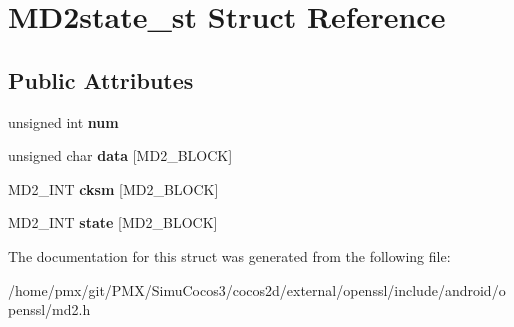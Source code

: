 \hypertarget{structMD2state__st}{}\section{M\+D2state\+\_\+st Struct Reference}
\label{structMD2state__st}
\subsection*{Public Attributes}
\begin{DoxyCompactItemize}
\item 
\mbox{\label{structMD2state__st_a065276e735f2af3cd657e71c79cb5e09}} 
unsigned int {\bfseries num}
\item 
\mbox{\label{structMD2state__st_a57082d32f125c264b715c2e669bd9a85}} 
unsigned char {\bfseries data} \mbox{[}M\+D2\+\_\+\+B\+L\+O\+CK\mbox{]}
\item 
\mbox{\label{structMD2state__st_accf2413ff4b1e9ab73fe4e7eddbb4bd5}} 
M\+D2\+\_\+\+I\+NT {\bfseries cksm} \mbox{[}M\+D2\+\_\+\+B\+L\+O\+CK\mbox{]}
\item 
\mbox{\label{structMD2state__st_a5f839760e83ff625a220bffc62db8cb9}} 
M\+D2\+\_\+\+I\+NT {\bfseries state} \mbox{[}M\+D2\+\_\+\+B\+L\+O\+CK\mbox{]}
\end{DoxyCompactItemize}


The documentation for this struct was generated from the following file\+:\begin{DoxyCompactItemize}
\item 
/home/pmx/git/\+P\+M\+X/\+Simu\+Cocos3/cocos2d/external/openssl/include/android/openssl/md2.\+h\end{DoxyCompactItemize}
